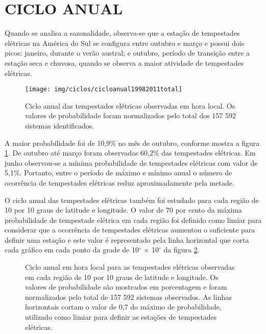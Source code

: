 \section{CICLO ANUAL}
\label{cicloanualsecao}

Quando se analisa a sazonalidade, observa-se que a estação de tempestades elétricas na América do Sul se configura entre outubro e março e possui dois picos: janeiro, durante o verão austral; e outubro, período de transição entre a estação seca e chuvosa, quando se observa a maior atividade de tempestades elétricas. 


\begin{figure}[!h]
\centering
{\texttt{[image: img/ciclos/cicloanual19982011total]}}
\caption{Ciclo anual das tempestades elétricas observadas em hora local. Os valores de probabilidade foram normalizados pelo total dos {157 592} sistemas identificados.}
\label{cicloanualtotal}
\end{figure} 

A maior probabilidade foi de 10,9\%  no mês de outubro, conforme mostra a figura \ref{cicloanualtotal}. De outubro até março foram observadas 60,2\% das tempestades elétricas. Em junho observou-se a mínima probabilidade de tempestades elétricas com valor de 5,1\%. Portanto, entre o período de máximo e mínimo anual o número de ocorrência de tempestades elétricas reduz aproximadamente pela metade.



O ciclo anual das tempestades elétricas também foi estudado para cada região de 10 por 10 graus de latitude e longitude. O valor de 70 por cento da máxima probabilidade de tempestade elétrica em cada região foi definido como limiar para considerar que a ocorrência de tempestades elétricas aumentou o suficiente para definir uma estação e este valor é representado pela linha horizontal que corta cada gráfico em cada ponto da grade de 10$^{\circ}$ $\times$ 10$^{\circ}$ da figura \ref{anual}. 

\begin{figure}[!h]
\caption{Ciclo anual em hora local para as tempestades elétricas observadas em cada região de 10 por 10 graus de latitude e longitude. Os valores de probabilidade são mostrados em porcentagem e foram normalizados pelo total de {157 592} sistemas observados. As linhas horizontais cortam o valor de 0,7 do máximo de probabilidade, utilizado como limiar para definir as estações de tempestades elétricas.}
\label{anual}
\end{figure}


